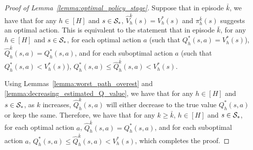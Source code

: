 \begin{proof}[Proof of Lemma~\ref{lemma:optimal_policy_stage}]
	Suppose that in episode $\bar{k}$, we have that for any $h \in [H]$ and $s \in \mathcal{S}_*$, $\hat{V}^{\bar{k}}_h(s)=V^{*}_h(s)$ and $\pi^{\bar{k}}_h(s)$ suggests an optimal action. This is equivalent to the statement that in episode $\bar{k}$, for any $h \in [H]$ and $s \in \mathcal{S}_*$, for each optimal action $a$ (such that $Q^{*}_h(s,a)=V^{*}_h(s)$), $\hat{Q}^{\bar{k}}_h(s,a)=Q^{*}_h(s,a)$, and for each suboptimal action $a$ (such that $Q^{*}_h(s,a)<V^{*}_h(s)$), $Q^{*}_h(s,a) \leq \hat{Q}^{\bar{k}}_h(s,a) < V^{*}_h(s)$.
	
	Using Lemmas~\ref{lemma:worst_path_overest} and \ref{lemma:decreasing_estimated_Q_value}, we have that for any $h \in [H]$ and $s \in \mathcal{S}_*$, as $k$ increases, $\hat{Q}^{k}_h(s,a)$ will either decrease to the true value $Q^{*}_h(s,a)$ or keep the same. Therefore, we have that for any $k \geq \bar{k}$, $h \in [H]$ and $s \in \mathcal{S}_*$, for each optimal action $a$, $\hat{Q}^{\bar{k}}_h(s,a)=Q^{*}_h(s,a)$, and for each suboptimal action $a$, $Q^{*}_h(s,a) \leq \hat{Q}^{\bar{k}}_h(s,a) < V^{*}_h(s)$, which completes the proof.
	
\end{proof}


